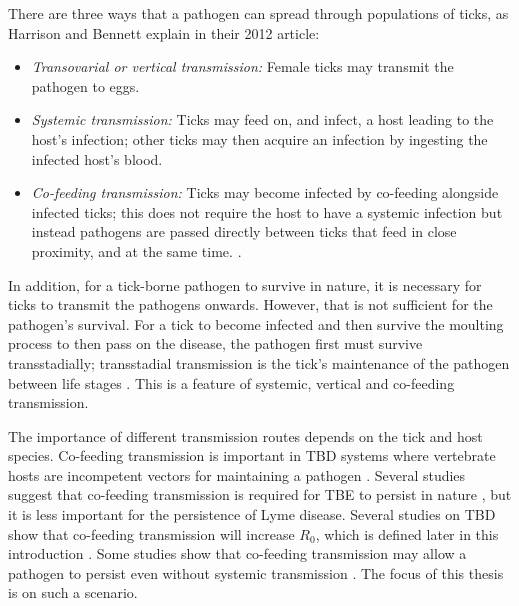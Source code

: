 \documentclass{article}
\begin{document}
There are three ways that a pathogen can spread through populations of ticks, as Harrison and Bennett explain in their 2012 article:
\begin{itemize}
	\item \textit{Transovarial or vertical transmission:} Female ticks may transmit the pathogen to eggs.
	\item \textit{Systemic transmission:} Ticks may feed on, and infect, a host leading to the host's infection; other ticks may then acquire an infection by ingesting the infected host's blood.
	\item \textit{Co-feeding transmission:} Ticks may become infected by co-feeding alongside infected ticks; this does not require the host to have a systemic infection but instead pathogens are passed directly between ticks that feed in close proximity, and at the same time. \cite{HARRISON2012}.
\end{itemize}

In addition, for a tick-borne pathogen to survive in nature, it is necessary for ticks to transmit the pathogens onwards. However, that is not sufficient for the pathogen's survival. For a tick to become infected and then survive the moulting process to then pass on the disease, the pathogen first must survive transstadially; transstadial transmission is the tick's maintenance of the pathogen between life stages \cite{Johnson2023d}. This is a feature of systemic, vertical and co-feeding transmission.

The importance of different transmission routes depends on the tick and host species. Co-feeding transmission is important in TBD systems where vertebrate hosts are incompetent vectors for maintaining a pathogen \cite{HARRISON2012}. Several studies suggest that co-feeding transmission is required for TBE to persist in nature \cite{Hartemink2008, HARRISON2012}, but it is less important for the persistence of Lyme disease. Several studies on TBD show that co-feeding transmission will increase $ R_0 $, which is defined later in this introduction \cite{JohnstoneRobertson2020, Rosa2003, Norman2004}. Some studies show that co-feeding transmission may allow a pathogen to persist even without systemic transmission \cite{Rosa2003, Norman2004}. The focus of this thesis is on such a scenario.
\end{document}
